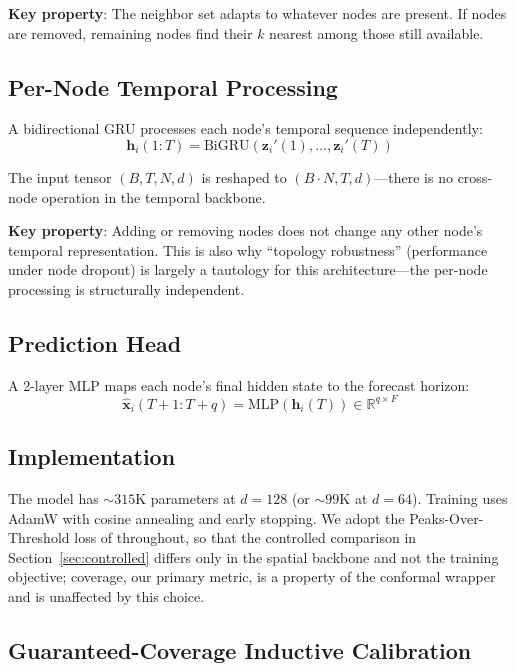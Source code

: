 \documentclass[journal]{IEEEtran}
\begin{document}
\textbf{Key property}: The neighbor set adapts to whatever nodes are present. If nodes are removed, remaining nodes find their $k$ nearest among those still available.

\subsection{Per-Node Temporal Processing}

A bidirectional GRU processes each node's temporal sequence independently:
\begin{equation}
\mathbf{h}_i(1{:}T) = \text{BiGRU}(\mathbf{z}_i'(1), \ldots, \mathbf{z}_i'(T))
\end{equation}

The input tensor $(B, T, N, d)$ is reshaped to $(B{\cdot}N, T, d)$---there is no cross-node operation in the temporal backbone.

\textbf{Key property}: Adding or removing nodes does not change any other node's temporal representation. This is also why ``topology robustness'' (performance under node dropout) is largely a tautology for this architecture---the per-node processing is structurally independent.

\subsection{Prediction Head}

A 2-layer MLP maps each node's final hidden state to the forecast horizon:
\begin{equation}
\hat{\mathbf{x}}_i(T{+}1{:}T{+}q) = \text{MLP}(\mathbf{h}_i(T)) \in \mathbb{R}^{q \times F}
\end{equation}

\subsection{Implementation}

The model has ${\sim}315$K parameters at $d{=}128$ (or ${\sim}99$K at $d{=}64$). Training uses AdamW with cosine annealing and early stopping. We adopt the Peaks-Over-Threshold loss of \cite{panja2026estgcn} throughout, so that the controlled comparison in Section~\ref{sec:controlled} differs only in the spatial backbone and not the training objective; coverage, our primary metric, is a property of the conformal wrapper and is unaffected by this choice.

\subsection{Guaranteed-Coverage Inductive Calibration}
\label{sec:conformal}
\end{document}
